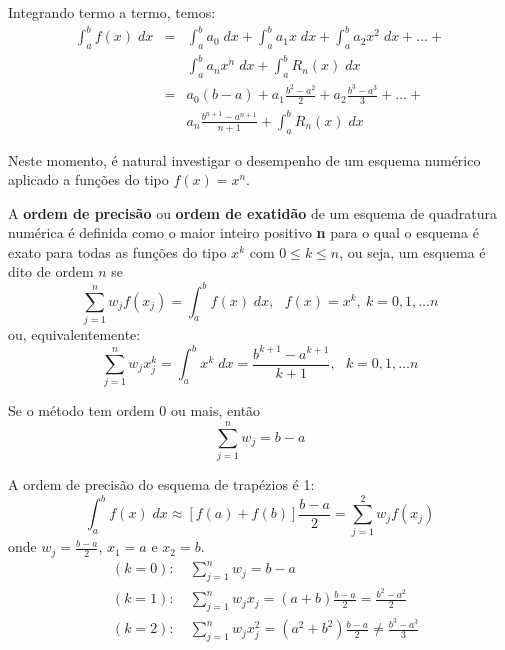 Integrando termo a termo, temos:
\begin{eqnarray*}
\int_a^bf(x)\;dx&=& \int_a^b a_0\;dx+\int_a^ba_1x\;dx + \int_a^ba_2x^2\;dx+\ldots+\\
&& \int_a^ba_n x^n\;dx +\int_a^bR_n(x)\;dx\\
&=& a_0(b-a)+a_1\frac{b^2-a^2}{2} + a_2\frac{b^3-a^3}{3} +\ldots+\\
&&a_n \frac{b^{n+1}-a^{n+1}}{n+1} +\int_a^bR_n(x)\;dx
\end{eqnarray*}

Neste momento, é natural investigar o desempenho de um esquema numérico aplicado a funções do tipo $f(x)=x^n$.

\begin{defn} A {\bf ordem de precisão} ou {\bf ordem de exatidão} de um esquema de quadratura numérica é definida como o maior inteiro positivo {\bf n} para o qual o esquema é exato para todas as funções do tipo $x^k$ com $0\leq k\leq n$, ou seja,
um esquema é dito de ordem $n$ se
$$\sum_{j=1}^n w_jf(x_j)=\int_a^b f(x)\;dx,~~~f(x)=x^k,~k=0,1,\ldots n$$
ou, equivalentemente:
$$\sum_{j=1}^n w_jx_j^k=\int_a^b x^k\;dx=\frac{b^{k+1}-a^{k+1}}{k+1},~~~k=0,1,\ldots n$$
\end{defn}

\begin{obs} Se o método tem ordem $0$ ou mais, então
$$\sum_{j=1}^n w_j=b-a$$
\end{obs}

\begin{ex}
A ordem de precisão do esquema de trapézios é 1:
$$\int_a^b f(x)\;dx \approx \left[f(a)+f(b)\right]\frac{b-a}{2}=\sum_{j=1}^2w_jf(x_j)$$
onde $w_j=\frac{b-a}{2}$, $x_1=a$ e $x_2=b$.
\begin{eqnarray*}
  &(k=0):\quad\sum_{j=1}^n w_j = b-a\\
  &(k=1):\quad\sum_{j=1}^n w_jx_j = (a+b)\frac{b-a}{2}=\frac{b^2-a^2}{2}\\
  &(k=2):\quad\sum_{j=1}^n w_jx_j^2 = (a^2+b^2)\frac{b-a}{2}\neq\frac{b^3-a^3}{3}
\end{eqnarray*}
\end{ex}

